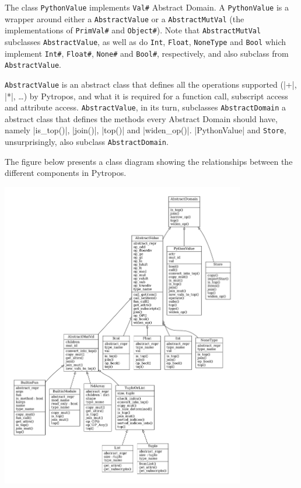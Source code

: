 The class \texttt{PythonValue} implements \texttt{Val\#} Abstract
Domain. A \texttt{PythonValue} is a wrapper around either a
\texttt{AbstractValue} or a \texttt{AbstractMutVal} (the implementations
of \texttt{PrimVal\#} and \texttt{Object\#}). Note that
\texttt{AbstractMutVal} subclasses \texttt{AbstractValue}, as well as do
\texttt{Int}, \texttt{Float}, \texttt{NoneType} and \texttt{Bool} which
implement \texttt{Int\#}, \texttt{Float\#}, \texttt{None\#} and
\texttt{Bool\#}, respectively, and also subclass from
\texttt{AbstractValue}.

\texttt{AbstractValue} is an abstract class that defines all the
operations supported (\pycode|+|, \pycode|*|, \ldots{}) by Pytropos, and
what it is required for a function call, subscript access and attribute
access. \texttt{AbstractValue}, in its turn, subclasses
\texttt{AbstractDomain} a abstract class that defines the methods every
Abstract Domain should have, namely \pycode|is_top()|, \pycode|join()|,
\pycode|top()| and \pycode|widen_op()|. \pycode|PythonValue| and
\texttt{Store}, unsurprisingly, also subclass \texttt{AbstractDomain}.

The figure below presents a class diagram showing the relationships
between the different components in Pytropos.

\includegraphics[width=0.8\textwidth]{figures/classes_Pytropos-small.pdf}
{}

